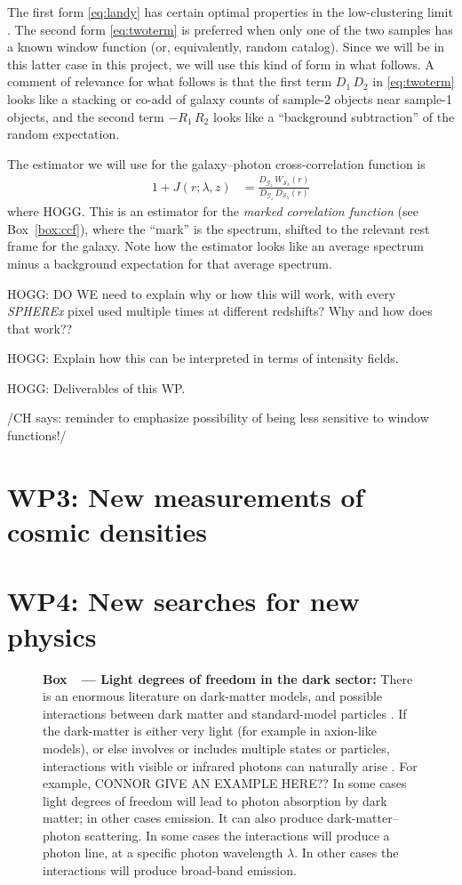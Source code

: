 \documentclass[12pt]{article}
\newcommand{\paragraphskip}{\medskip}
\renewcommand{\paragraph}[1]{\par\paragraphskip\noindent\textbf{#1}}
\newcounter{box}
\newcommand{\boxname}{Box}
\newcommand{\boxref}[1]{\boxname~\ref{#1}}
\newenvironment{explainer}[1][something random]{\begin{figure}[b!]\begin{mdframed}[roundcorner=2pt, backgroundcolor=black!05]\refstepcounter{box}\paragraph{\boxname~\thebox\ --- {#1}:}}{\end{mdframed}\end{figure}}
\newcommand{\CH}[1]{{\color{blue!70!black} /CH says: #1/}}
\begin{document}
The first form \eqref{eq:landy} has certain optimal properties in the low-clustering limit \cite{landy}.
The second form \eqref{eq:twoterm} is preferred when only one of the two samples has a known window function (or, equivalently, random catalog).
Since we will be in this latter case in this project, we will use this kind of form in what follows.
A comment of relevance for what follows is that the first term $D_1\,D_2$ in \eqref{eq:twoterm} looks like a stacking or co-add of galaxy counts of sample-2 objects near sample-1 objects, and the second term $-R_1\,R_2$ looks like a ``background subtraction'' of the random expectation.

The estimator we will use for the galaxy--photon cross-correlation function is
\begin{align}
  1 + J(r; \lambda, z) &= \frac{D_{\mathcal{G}_z} \, W_{\mathcal{S}_\lambda} (r)}{D_{\mathcal{G}_z} \, D_{\mathcal{S}_\lambda} (r)}
  \label{eq:ccf}
\end{align}
where HOGG.
This is	an estimator for the \emph{marked correlation function}	(see \boxref{box:ccf}),	where the ``mark'' is the spectrum, shifted to the relevant rest frame for the galaxy.
Note how the estimator looks like an average spectrum minus a background expectation for that average spectrum.

HOGG: DO WE need to explain why or how this will work, with every \textsl{SPHEREx} pixel used multiple times at different redshifts? Why and how does that work??

HOGG: Explain how this can be interpreted in terms of intensity fields.

HOGG: Deliverables of this WP.

\CH{reminder to emphasize possibility of being less sensitive to window functions!}

\section*{WP3: New measurements of cosmic densities}

\section*{WP4: New searches for new physics}
\begin{explainer}[Light degrees of freedom in the dark sector]
    There is an enormous literature on dark-matter models, and possible interactions between dark matter and standard-model particles \cite{dmreview}.
    If the dark-matter is either very light (for example in axion-like models), or else involves or includes multiple states or particles, interactions with visible or infrared photons can naturally arise \cite{lightdegrees}.
    For example, CONNOR GIVE AN EXAMPLE HERE??
    In some cases light degrees of freedom will lead to photon absorption by dark matter; in other cases emission.
    It can also produce dark-matter--photon scattering.
    In some cases the interactions will produce a photon line, at a specific photon wavelength $\lambda$.
    In other cases the interactions will produce broad-band emission.
\end{explainer}
\end{document}
